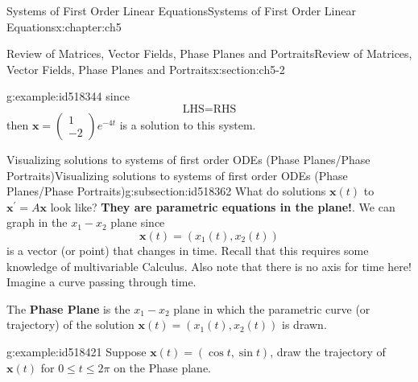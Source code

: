 \documentclass[oneside,10pt,]{book}
\newcommand{\terminology}[1]{\textbf{#1}}
\numberwithin{equation}{section}
\numberwithin{equation}{section}
\begin{document}
\begin{chapterptx}{Systems of First Order Linear Equations}{}{Systems of First Order Linear Equations}{}{}{x:chapter:ch5}
\begin{sectionptx}{Review of Matrices, Vector Fields, Phase Planes and Portraits}{}{Review of Matrices, Vector Fields, Phase Planes and Portraits}{}{}{x:section:ch5-2}
\begin{example}{}{g:example:id518344}
since%
\begin{equation*}
\text{LHS}=\text{RHS}
\end{equation*}
then \(\mathbf{x}=\left(\begin{array}{c}
1\\
-2
\end{array}\right)e^{-4t}\) is a solution to this system.%
\end{example}
%
%
\typeout{************************************************}
\typeout{************************************************}
%
\begin{subsectionptx}{Visualizing solutions to systems of first order ODEs (Phase Planes\slash{}Phase Portraits)}{}{Visualizing solutions to systems of first order ODEs (Phase Planes\slash{}Phase Portraits)}{}{}{g:subsection:id518362}
What do solutions \(\mathbf{x}(t)\) to \(\mathbf{x}^{\prime}=A\mathbf{x}\) look like? \terminology{They are parametric equations in the plane!}. We can graph in the \(x_{1}-x_{2}\) plane since%
\begin{equation*}
\mathbf{x}(t)=\left(x_{1}(t),x_{2}(t)\right)
\end{equation*}
is a vector (or point) that changes in time. Recall that this requires some knowledge of multivariable Calculus. Also note that there is no axis for time here! Imagine a curve passing through time.%
\par
The \terminology{Phase Plane} is  the \(x_1-x_2\) plane in which the parametric curve (or trajectory) of the solution \(\mathbf{x}(t)=\left(x_{1}(t),x_{2}(t)\right)\) is drawn.%
\begin{example}{}{g:example:id518421}%
Suppose \(\mathbf{x}(t)=\left(\cos t,\sin t\right)\), draw the trajectory of \(\mathbf{x}(t) \) for \(0\leq t\leq2\pi\) on the Phase plane. \begin{image}{0}{1}{0}%

\end{image}
\end{example}
\end{subsectionptx}
\end{sectionptx}
\end{chapterptx}
\end{document}

